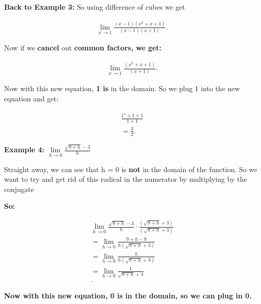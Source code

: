 \documentclass{report}
\begin{document}
    \bigbreak \noindent 
    \textbf{Back to Example 3:}
    So using difference of cubes we get
    
    \begin{align*}
        \lim\limits_{x \to 1}{\frac{ \left(x-1\right) \left(x^2+x+1\right)}{ \left(x-1\right) \left(x+1\right)}} 
    .\end{align*}
    
    \bigbreak \noindent 
    \noindent Now if we \textbf{cancel} out \textbf{common factors, we get: }

    \begin{align*}
        \lim\limits_{x \to 1}{ \frac{ \left(x^2+x+1\right)}{ \left(x+1\right)}}
    .\end{align*}

    \bigbreak \noindent 
    Now with this new equation, \textbf{1 is} in the domain. So we plug 1 into the new equation and get:

    \begin{align*}
        \frac{1^1+1+1}{1+1} \\
        = \frac{3}{2}
    .\end{align*}

    \bigbreak \noindent \bigbreak \noindent  
    \begin{large}
        \textbf{Example 4: $\lim\limits_{h \to 0}{ \frac{\sqrt{9+h} -3}{h}}$ } 
    \end{large}

    \bigbreak \noindent \bigbreak \noindent  
    Straight away, we can see that h = 0 is \textbf{not} in the domain of the function. 
    So we want to try and get rid of this radical in the numerator by multiplying by the
    conjugate
    
    \bigbreak \noindent 
    \textbf{So:}

    \begin{align*}
        \lim\limits_{h \to 0}{ \frac{\sqrt{9+h} - 3}{h}} \cdot \frac{ \left(\sqrt{9+h} +3\right)}{ \left(\sqrt{9+h} +3\right)} \\       
        = \lim\limits_{h \to 0}{ \frac{9+h-9}{h \left(\sqrt{9+h}+3\right)}} \\ 
        = \lim\limits_{h \to 0}{ \frac{h}{h \left(\sqrt{9+h}+3\right)}} \\
        = \lim\limits_{h \to 0}{ \frac{1}{\sqrt{9+h}+3}} \\
    .\end{align*}

    \noindent \textbf{Now with this new equation, 0 is in the domain, so we can plug in 0.}
\end{document}
